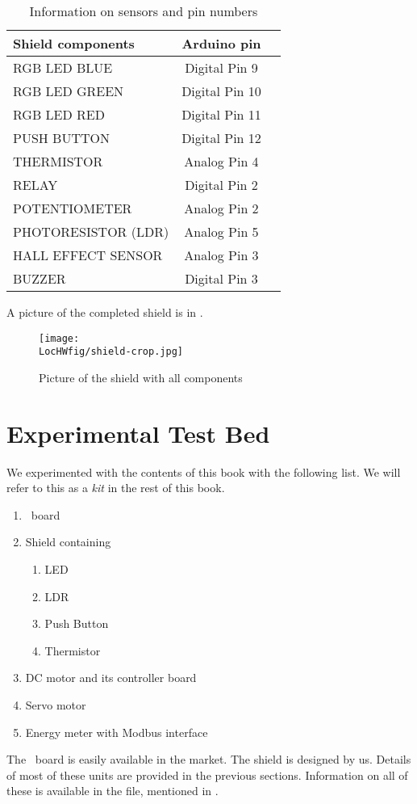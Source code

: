 \begin{table}
\centering
\caption{Information on sensors and pin numbers}
\label{shield-table}
\begin{tabular}{ || l | c || r }
 \hline		
{\bf Shield components} & {\bf Arduino pin}\\ \hline	
RGB LED BLUE & Digital Pin 9\\
RGB LED GREEN & Digital Pin 10\\
RGB LED RED & Digital Pin 11\\
PUSH BUTTON & Digital Pin 12\\
THERMISTOR & Analog Pin 4\\
RELAY  & Digital Pin 2\\
POTENTIOMETER & Analog Pin 2\\
PHOTORESISTOR (LDR) & Analog Pin 5\\
HALL EFFECT SENSOR & Analog Pin 3\\
BUZZER & Digital Pin 3\\
 \hline 
\end{tabular}
\end{table}
A picture of the completed shield is in .
\begin{figure}
  \centering
  \texttt{[image: \\LocHWfig/shield-crop.jpg]}
  \caption{Picture of the shield with all components}
  \label{shield}
\end{figure}

\section{Experimental Test Bed}
We experimented with the contents of this book with the
following list.  We will refer to this as a \emph{kit} in the rest of
this book.
\begin{enumerate}
\item \arduino\ board
\item Shield containing
\begin{enumerate}
\item LED
\item LDR
\item Push Button
\item Thermistor
\end{enumerate}
\item DC motor and its controller board
\item Servo motor
\item Energy meter with Modbus interface
\end{enumerate}

The \arduino\ board is easily available in the market.  The shield is
designed by us.  Details of most of these units are provided in the
previous sections.  Information on all of these is available in the
file, mentioned in .


